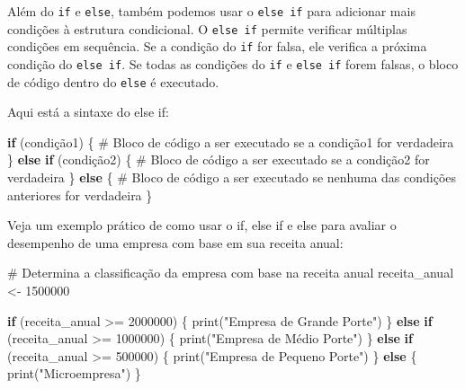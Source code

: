 \documentclass[
  portuguese,
  letterpaper,
  DIV=11,
  numbers=noendperiod]{scrreprt}
\newenvironment{Shaded}{\begin{snugshade}}{\end{snugshade}}
\newcommand{\CommentTok}[1]{\textcolor[rgb]{0.37,0.37,0.37}{#1}}
\newcommand{\ControlFlowTok}[1]{\textcolor[rgb]{0.00,0.23,0.31}{\textbf{#1}}}
\newcommand{\DecValTok}[1]{\textcolor[rgb]{0.68,0.00,0.00}{#1}}
\newcommand{\FunctionTok}[1]{\textcolor[rgb]{0.28,0.35,0.67}{#1}}
\newcommand{\NormalTok}[1]{\textcolor[rgb]{0.00,0.23,0.31}{#1}}
\newcommand{\OtherTok}[1]{\textcolor[rgb]{0.00,0.23,0.31}{#1}}
\newcommand{\SpecialCharTok}[1]{\textcolor[rgb]{0.37,0.37,0.37}{#1}}
\newcommand{\StringTok}[1]{\textcolor[rgb]{0.13,0.47,0.30}{#1}}
\theoremstyle{definition}
\theoremstyle{remark}
\begin{document}
Além do \texttt{if} e \texttt{else}, também podemos usar o
\texttt{else\ if} para adicionar mais condições à estrutura condicional.
O \texttt{else\ if} permite verificar múltiplas condições em sequência.
Se a condição do \texttt{if} for falsa, ele verifica a próxima condição
do \texttt{else\ if}. Se todas as condições do \texttt{if} e
\texttt{else\ if} forem falsas, o bloco de código dentro do
\texttt{else} é executado.

Aqui está a sintaxe do else if:

\begin{Shaded}
\begin{Highlighting}[]
\ControlFlowTok{if}\NormalTok{ (condição1) \{}
  \CommentTok{\# Bloco de código a ser executado se a condição1 for verdadeira}
\NormalTok{\} }\ControlFlowTok{else} \ControlFlowTok{if}\NormalTok{ (condição2) \{}
  \CommentTok{\# Bloco de código a ser executado se a condição2 for verdadeira}
\NormalTok{\} }\ControlFlowTok{else}\NormalTok{ \{}
  \CommentTok{\# Bloco de código a ser executado se nenhuma das condições anteriores for verdadeira}
\NormalTok{\}}
\end{Highlighting}
\end{Shaded}

Veja um exemplo prático de como usar o if, else if e else para avaliar o
desempenho de uma empresa com base em sua receita anual:

\begin{Shaded}
\begin{Highlighting}[]
\CommentTok{\# Determina a classificação da empresa com base na receita anual}
\NormalTok{receita\_anual }\OtherTok{\textless{}{-}} \DecValTok{1500000}

\ControlFlowTok{if}\NormalTok{ (receita\_anual }\SpecialCharTok{\textgreater{}=} \DecValTok{2000000}\NormalTok{) \{}
  \FunctionTok{print}\NormalTok{(}\StringTok{"Empresa de Grande Porte"}\NormalTok{)}
\NormalTok{\} }\ControlFlowTok{else} \ControlFlowTok{if}\NormalTok{ (receita\_anual }\SpecialCharTok{\textgreater{}=} \DecValTok{1000000}\NormalTok{) \{}
  \FunctionTok{print}\NormalTok{(}\StringTok{"Empresa de Médio Porte"}\NormalTok{)}
\NormalTok{\} }\ControlFlowTok{else} \ControlFlowTok{if}\NormalTok{ (receita\_anual }\SpecialCharTok{\textgreater{}=} \DecValTok{500000}\NormalTok{) \{}
  \FunctionTok{print}\NormalTok{(}\StringTok{"Empresa de Pequeno Porte"}\NormalTok{)}
\NormalTok{\} }\ControlFlowTok{else}\NormalTok{ \{}
  \FunctionTok{print}\NormalTok{(}\StringTok{"Microempresa"}\NormalTok{)}
\NormalTok{\}}
\end{Highlighting}
\end{Shaded}
\end{document}
